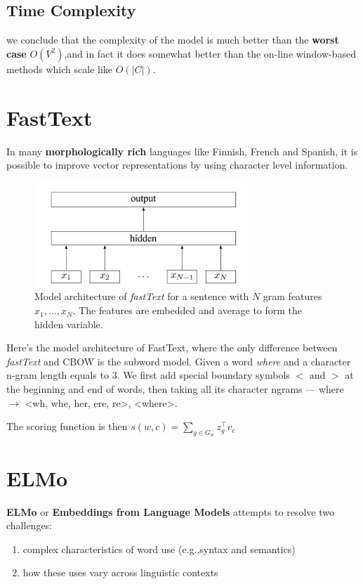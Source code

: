 \documentclass[a3paper, 12pt]{book} %
\begin{document}
\subsection{Time Complexity}

we conclude that the complexity of the model is much better than the \textbf{worst case} $O(V^2)$,and in fact it does somewhat better than the on-line window-based methods which scale like $O(|C|)$.

\section{FastText}
In many \textbf{morphologically rich} languages like Finnish, French and Spanish, it is possible to improve vector representations by using character level information.

\begin{figure}[htpb]
	\centering
	\includegraphics[width=8cm]{figures/fasttext_model_architecture.png}
	\caption{Model architecture of \emph{fastText} for a sentence with $N$ gram features $x_1,...,x_N$. The features are embedded and average to form the hidden variable.}
	\label{fig:boat1}
\end{figure}


Here's the model architecture of FastText, where the only difference between \emph{fastText} and CBOW is the subword model. Given a word \emph{where} and a character n-gram length equals to $3$. We first add special boundary symbols $<$ and $>$ at the beginning and end of words, then taking all its character ngrams --- where $\to$ <wh, whe, her, ere, re>, <where>.

The scoring function is then $s(w,c)=\sum_{g\in G_w}{z_g^{\top}v_c}$ 


\section{ELMo}
\textbf{ELMo} or \textbf{Embeddings from Language Models} attempts to resolve two challenges:
\begin{enumerate}
	\item complex characteristics of word use (e.g.,syntax and semantics)
	\item how these uses vary across linguistic contexts \\
\end{enumerate} 
\end{document}
